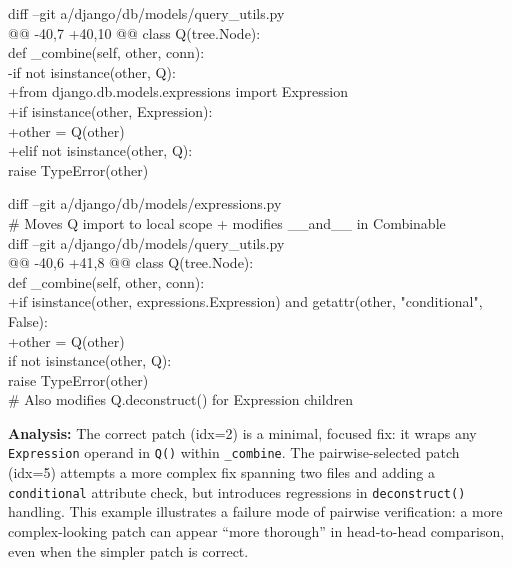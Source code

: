 \begin{tcolorbox}[
    colback=green!5,
    colframe=green!60!black,
    title={\textbf{Pointwise-Selected Patch (idx=2): Resolves the issue \checkmark}},
    coltitle=white,
    fonttitle=\small\bfseries,
    breakable,
    enhanced
]
\small\ttfamily
diff --git a/django/db/models/query\_utils.py\\
@@ -40,7 +40,10 @@ class Q(tree.Node):\\
\quad def \_combine(self, other, conn):\\
-\quad\quad if not isinstance(other, Q):\\
+\quad\quad from django.db.models.expressions import Expression\\
+\quad\quad if isinstance(other, Expression):\\
+\quad\quad\quad other = Q(other)\\
+\quad\quad elif not isinstance(other, Q):\\
\quad\quad\quad raise TypeError(other)
\end{tcolorbox}

\begin{tcolorbox}[
    colback=red!5,
    colframe=red!60!black,
    title={\textbf{Pairwise-Selected Patch (idx=5): Does not resolve the issue \ding{55}}},
    coltitle=white,
    fonttitle=\small\bfseries,
    breakable,
    enhanced
]
\small\ttfamily
diff --git a/django/db/models/expressions.py\\
\# Moves Q import to local scope + modifies \_\_and\_\_ in Combinable\\[0.3em]
diff --git a/django/db/models/query\_utils.py\\
@@ -40,6 +41,8 @@ class Q(tree.Node):\\
\quad def \_combine(self, other, conn):\\
+\quad\quad if isinstance(other, expressions.Expression) and getattr(other, "conditional", False):\\
+\quad\quad\quad other = Q(other)\\
\quad\quad if not isinstance(other, Q):\\
\quad\quad\quad raise TypeError(other)\\[0.3em]
\# Also modifies Q.deconstruct() for Expression children
\end{tcolorbox}

\noindent\textbf{Analysis:} The correct patch (idx=2) is a minimal, focused fix: it wraps any \texttt{Expression} operand in \texttt{Q()} within \texttt{\_combine}. The pairwise-selected patch (idx=5) attempts a more complex fix spanning two files and adding a \texttt{conditional} attribute check, but introduces regressions in \texttt{deconstruct()} handling. This example illustrates a failure mode of pairwise verification: a more complex-looking patch can appear ``more thorough'' in head-to-head comparison, even when the simpler patch is correct.


